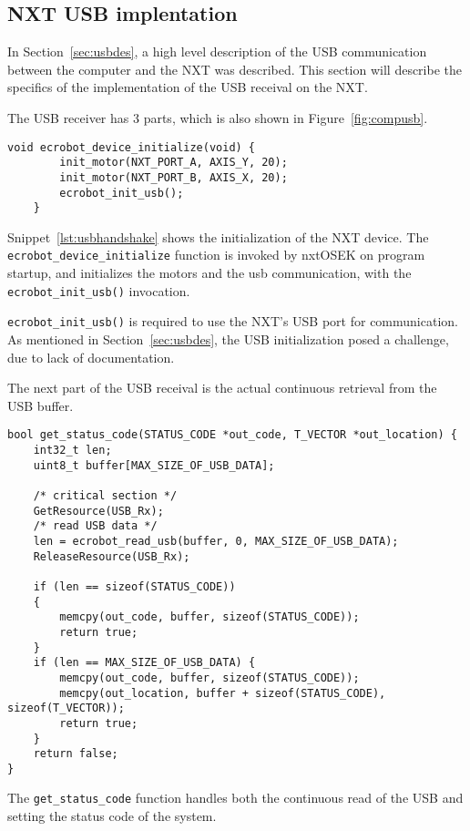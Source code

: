 \subsection{NXT USB implentation}
\label{sec:nxtusbimp}
In Section~\ref{sec:usbdes}, a high level description of the USB communication between the computer and the NXT was described.
This section will describe the specifics of the implementation of the USB receival on the NXT.

The USB receiver has 3 parts, which is also shown in Figure~\ref{fig:compusb}.

\begin{lstlisting}[language=CSharp,label={lst:usbhandshake},caption={ecrobot\_device\_initialize method from nxt.c}]
    void ecrobot_device_initialize(void) {
        init_motor(NXT_PORT_A, AXIS_Y, 20);
        init_motor(NXT_PORT_B, AXIS_X, 20);
        ecrobot_init_usb();
    }
\end{lstlisting}


Snippet~\ref{lst:usbhandshake} shows the initialization of the NXT device.
The \texttt{ecrobot\_device\_initialize} function is invoked by nxtOSEK on program startup, and initializes the motors and the usb communication, with the \texttt{ecrobot\_init\_usb()} invocation.

\texttt{ecrobot\_init\_usb()} is required to use the NXT's USB port for communication.
As mentioned in Section~\ref{sec:usbdes}, the USB initialization posed a challenge, due to lack of documentation.

The next part of the USB receival is the actual continuous retrieval from the USB buffer.
\begin{lstlisting}[language=CSharp,label={lst:usbreceive},caption={get\_status\_code method from usb.c}]
bool get_status_code(STATUS_CODE *out_code, T_VECTOR *out_location) {
	int32_t len;
	uint8_t buffer[MAX_SIZE_OF_USB_DATA];

	/* critical section */
	GetResource(USB_Rx);
	/* read USB data */
	len = ecrobot_read_usb(buffer, 0, MAX_SIZE_OF_USB_DATA);
	ReleaseResource(USB_Rx);

	if (len == sizeof(STATUS_CODE))
	{
		memcpy(out_code, buffer, sizeof(STATUS_CODE));
		return true;
	}
	if (len == MAX_SIZE_OF_USB_DATA) {
		memcpy(out_code, buffer, sizeof(STATUS_CODE));
		memcpy(out_location, buffer + sizeof(STATUS_CODE), sizeof(T_VECTOR));
		return true;
	}
	return false;
}
\end{lstlisting}
The \texttt{get\_status\_code} function handles both the continuous read of the USB and setting the status code of the system.

